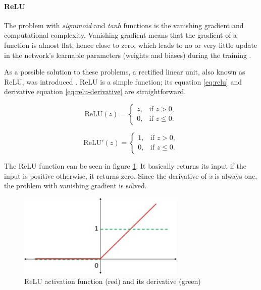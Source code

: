\paragraph{ReLU}
The problem with \textit{sigmmoid} and \textit{tanh} functions is the vanishing gradient and computational complexity. Vanishing gradient means that the gradient of a function is almost flat, hence close to zero, which leads to no or very little update in the network's learnable parameters (weights and biases) during the training \cite{Dubey2022, Aby2025}.

As a possible solution to these problems, a rectified linear unit, also known as ReLU, was introduced \cite{Nair2010}. ReLU is a simple function; its equation \ref{eq:relu} and derivative equation \ref{eq:relu-derivative} are straightforward.

\noindent
\begin{multicols}{2} %
    \begin{equation}
    \text{ReLU}(z) =
    \begin{cases} 
        z, & \text{if } z > 0, \\
        0, & \text{if } z \leq 0.
    \end{cases}
    \label{eq:relu}
    \end{equation}

    \begin{equation}
    \text{ReLU}'(z) =
    \begin{cases} 
        1, & \text{if } z > 0, \\
        0, & \text{if } z \leq 0.
    \end{cases}
    \label{eq:relu-derivative}
    \end{equation}
\end{multicols}

The ReLU function can be seen in figure \ref{fig:relu}. It basically returns its input if the input is positive otherwise, it returns zero. Since the derivative of \textit{x} is always one, the problem with vanishing gradient is solved. 

\begin{figure}[H]
\begin{centering}
\includegraphics[width=8cm]{assets/images/relu.jpg}
\par\end{centering}
\caption{ReLU activation function (red) and its derivative (green) \cite{Santosh2022-2}}
\label{fig:relu}
\end{figure}

